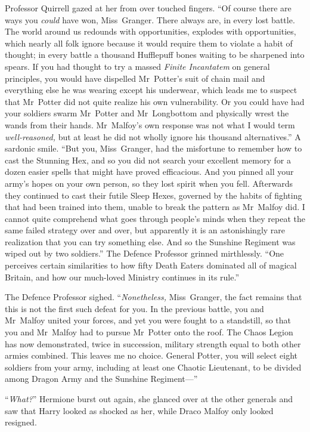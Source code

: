 Professor Quirrell gazed at her from over touched fingers. “Of course there are ways you \emph{could} have won, Miss~Granger. There always are, in every lost battle. The world around us redounds with opportunities, explodes with opportunities, which nearly all folk ignore because it would require them to violate a habit of thought; in every battle a thousand Hufflepuff bones waiting to be sharpened into spears. If you had thought to try a massed \emph{Finite Incantatem} on general principles, you would have dispelled Mr~Potter’s suit of chain mail and everything else he was wearing except his underwear, which leads me to suspect that Mr~Potter did not quite realize his own vulnerability. Or you could have had your soldiers swarm Mr~Potter and Mr~Longbottom and physically wrest the wands from their hands. Mr~Malfoy’s own response was not what I would term \emph{well-reasoned,} but at least he did not wholly ignore his thousand alternatives.” A sardonic smile. “But you, Miss~Granger, had the misfortune to remember how to cast the Stunning Hex, and so you did not search your excellent memory for a dozen easier spells that might have proved efficacious. And you pinned all your army’s hopes on your own person, so they lost spirit when you fell. Afterwards they continued to cast their futile Sleep Hexes, governed by the habits of fighting that had been trained into them, unable to break the pattern as Mr~Malfoy did. I cannot quite comprehend what goes through people’s minds when they repeat the same failed strategy over and over, but apparently it is an astonishingly rare realization that you can try something else. And so the Sunshine Regiment was wiped out by two soldiers.” The Defence Professor grinned mirthlessly. “One perceives certain similarities to how fifty Death Eaters dominated all of magical Britain, and how our much-loved Ministry continues in its rule.”

The Defence Professor sighed. “\emph{Nonetheless,} Miss~Granger, the fact remains that this is not the first such defeat for you. In the previous battle, you and Mr~Malfoy united your forces, and yet you were fought to a standstill, so that you and Mr~Malfoy had to pursue Mr~Potter onto the roof. The Chaos Legion has now demonstrated, twice in succession, military strength equal to both other armies combined. This leaves me no choice. General Potter, you will select eight soldiers from your army, including at least one Chaotic Lieutenant, to be divided among Dragon Army and the Sunshine Regiment—”

“\emph{What?}” Hermione burst out again, she glanced over at the other generals and saw that Harry looked as shocked as her, while Draco Malfoy only looked resigned.

